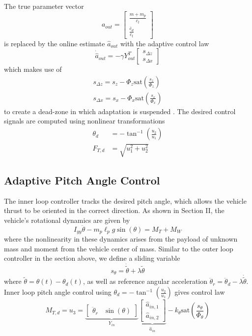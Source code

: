 \documentclass[letterpaper, 10 pt, conference]{ieeeconf}\usepackage[margin=1in]{geometry}
\begin{document}
The true parameter vector 
\begin{equation}
	a_{out} = \begin{bmatrix}
		 \frac{m+m_p}{c_t}\\
		 \frac{\bar{c}_d}{c_t}
	\end{bmatrix}
\end{equation} is replaced by the online estimate $\hat{a}_{out}$ with the adaptive control law
\begin{equation}
	\dot{\hat{a}}_{out} = - \gamma Y^T_{out} \begin{bmatrix}
		s_{\Delta z} \\ s_{\Delta x}
	\end{bmatrix}
\end{equation}
which makes use of
\begin{align}
	s_{\Delta z} = s_z - \Phi_z \text{sat}(\frac{s_z}{\Phi_z})\\
	s_{\Delta x} = s_x - \Phi_x \text{sat}(\frac{s_x}{\Phi_x})
\end{align}
to create a dead-zone in which adaptation is suspended \cite{slotine1991applied}. The desired control signals are computed using nonlinear transformations
\begin{align}
	\theta_d &= -\tan^{-1}{(\frac{u_2}{u_1})} \\
	F_{T,d} &= \sqrt{u_1^2 + u_2^2}
\end{align}

\subsection{Adaptive Pitch Angle Control}
The inner loop controller tracks the desired pitch angle, which allows the vehicle thrust to be oriented in the correct direction. As shown in Section II, the vehicle's rotational dynamics are given by
\begin{equation}
	I_{yy} \ddot{\theta} - m_p \ell_p g \sin(\theta) = M_T + M_W
\end{equation}
where the nonlinearity in these dynamics arises from the payload of unknown mass and moment from the vehicle center of mass. Similar to the outer loop controller in the section above, we define a sliding variable
\begin{equation}
	s_\theta = \dot{\tilde{\theta}} + \lambda \tilde \theta
\end{equation}
where $\tilde{\theta} = \theta(t) - \theta_d(t)$, as well as reference angular acceleration $\ddot{\theta}_r = \ddot{\theta}_d - \lambda \dot{\tilde{\theta}}$. Inner loop pitch angle control using $\theta_d = -\tan^{-1}{(\frac{u_2}{u_1})}$ gives control law
\begin{equation}
	M_{T,d} = u_3 = \underbrace{\begin{bmatrix}
		\ddot{\theta}_r & \sin{(\theta)}
	\end{bmatrix}}_{Y_{in}} \underbrace{\begin{bmatrix}
		\hat{a}_{in,1} \\
		\hat{a}_{in,2}
	\end{bmatrix}}_{\hat{a}_{in}} - k_\theta \text{sat}(\frac{s_\theta}{\Phi_\theta})
\end{equation}
\end{document}
